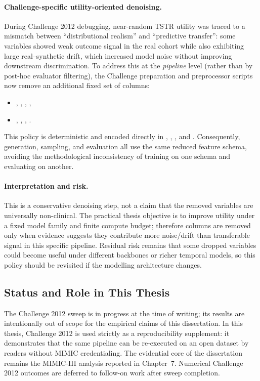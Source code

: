 \paragraph{Challenge-specific utility-oriented denoising.}
During Challenge 2012 debugging, near-random TSTR utility was traced to a mismatch between ``distributional realism'' and ``predictive transfer'': some variables showed weak outcome signal in the real cohort while also exhibiting large real--synthetic drift, which increased model noise without improving downstream discrimination. To address this at the \emph{pipeline} level (rather than by post-hoc evaluator filtering), the Challenge preparation and preprocessor scripts now remove an additional fixed set of columns:
\begin{itemize}\tightlist
    \item {}, , , ,
    \item {}, , , .
\end{itemize}
This policy is deterministic and encoded directly in , , , and . Consequently, generation, sampling, and evaluation all use the same reduced feature schema, avoiding the methodological inconsistency of training on one schema and evaluating on another.

\paragraph{Interpretation and risk.}
This is a conservative denoising step, not a claim that the removed variables are universally non-clinical. The practical thesis objective is to improve utility under a fixed model family and finite compute budget; therefore columns are removed only when evidence suggests they contribute more noise/drift than transferable signal in this specific pipeline. Residual risk remains that some dropped variables could become useful under different backbones or richer temporal models, so this policy should be revisited if the modelling architecture changes.


\subsection{Status and Role in This Thesis}

The Challenge 2012 sweep is in progress at the time of writing; its results are intentionally out of scope for the empirical claims of this dissertation. In this thesis, Challenge 2012 is used strictly as a reproducibility supplement: it demonstrates that the same pipeline can be re-executed on an open dataset by readers without MIMIC credentialing. The evidential core of the dissertation remains the MIMIC-III analysis reported in Chapter~7. Numerical Challenge 2012 outcomes are deferred to follow-on work after sweep completion.

